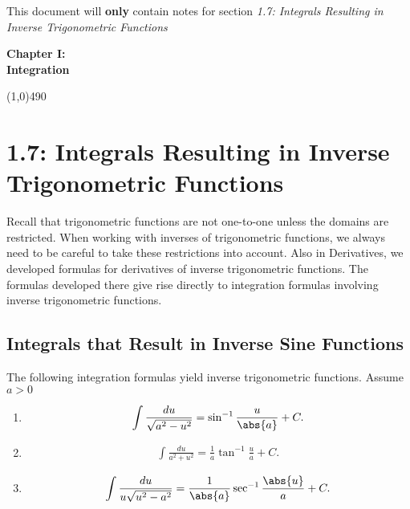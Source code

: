 \documentclass{report}
\begin{document}
    \bigbreak \noindent 
    This document will \textbf{only} contain notes for section \textit{1.7: Integrals Resulting in Inverse Trigonometric Functions}
    \pagebreak \bigbreak \noindent 
    \vspace{2in} \\
    \begin{Huge}
      \textbf{Chapter I: \\ Integration}  
    \end{Huge}
    \bigbreak \noindent 
    \line(1,0){490}
    \bigbreak \noindent 
    \section*{\LARGE 1.7: Integrals Resulting in Inverse Trigonometric Functions}
    \bigbreak \noindent 
    Recall that trigonometric functions are not one-to-one unless the domains are restricted. When working with inverses of trigonometric functions, we always need to be careful to take these restrictions into account. Also in Derivatives, we developed formulas for derivatives of inverse trigonometric functions. The formulas developed there give rise directly to integration formulas involving inverse trigonometric functions.
    \bigbreak \noindent 
    \subsection{Integrals that Result in Inverse Sine Functions}
    \bigbreak \noindent 
    The following integration formulas yield inverse trigonometric functions. Assume  $a>0$
    \begin{enumerate}
        \item \begin{align*}
                \int \frac{du}{\sqrt{a^{2}-u^{2}}} = \sin^{-1}{\frac{u}{\abs{a}}} + C
        .\end{align*}
    \item \begin{align*}
        \int \frac{du}{a^{2}+u^{2}} = \frac{1}{a}\tan^{-1}{\frac{u}{a}} + C
    .\end{align*}
    \item \begin{align*}
            \int \frac{du}{u\sqrt{u^{2}-a^{2}}} = \frac{1}{\abs{a}}\sec^{-1}{\frac{\abs{u}}{a}} + C
    .\end{align*}
    \end{enumerate}
    \bigbreak \noindent 
\end{document}
